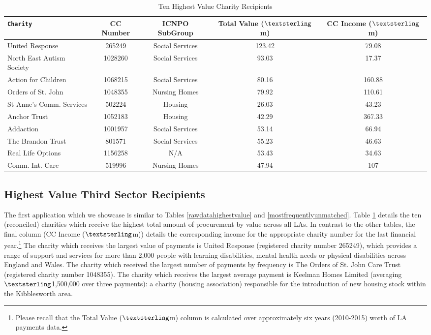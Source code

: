 \documentclass[11pt]{article}
\begin{document}
\begin{table}[!b]
\centering
\caption{Ten Highest Value Charity Recipients}
\begin{small}
\label{highestvaluecharity}
\begin{tabular}{lcccc}
\toprule
\texttt{Charity} & CC Number & ICNPO  SubGroup & Total Value ($\textsterling$m) & CC Income ($\textsterling$m) \\  \midrule
United Response & 265249 & Social Services & 123.42 & 79.08  \\ 
North East Autism Society & 1028260 & Social Services & 93.03 & 17.37\\
Action for Children & 1068215 & Social Services & 80.16 & 160.88\\
Orders of St. John & 1048355 & Nursing Homes & 79.92 & 110.61\\
St Anne's Comm. Services & 502224 & Housing & 26.03 & 43.23\\
Anchor Trust & 1052183 & Housing & 42.29 & 367.33\\
Addaction & 1001957 & Social Services & 53.14 & 66.94\\
The Brandon Trust & 801571 & Social Services & 55.23 & 46.63\\
Real Life Options & 1156258 & N/A & 53.43 & 34.63\\
Comm. Int. Care & 519996 & Nursing Homes & 47.94 & 107 \\ \bottomrule
\end{tabular}
\end{small}
\end{table}

\subsection{Highest Value Third Sector Recipients}

The first application which we showcase is similar to Tables \ref{rawdatahighestvalue} and \ref{mostfrequentlyunmatched}. Table \ref{highestvaluecharity} details the ten (reconciled) charities which receive the highest total amount of procurement by value across all LAs. In contrast to the other tables, the final column (CC Income ($\textsterling$m)) details the corresponding income for the appropriate charity number for the last financial year.\footnote{Please recall that the Total Value ($\textsterling$m) column is calculated over approximately six years (2010-2015) worth of LA payments data.} The charity which receives the largest value of payments is United Response (registered charity number 265249), which provides a range of support and services for more than 2,000 people with learning disabilities, mental health needs or physical disabilities across England and Wales. The charity which received the largest number of payments by frequency is The Orders of St. John Care Trust (registered charity number 1048355). The charity which receives the largest average payment is Keelman Homes Limited (averaging $\textsterling$1,500,000 over three payments): a charity (housing association) responsible for the introduction of new housing stock within the Kibblesworth area.
\end{document}
